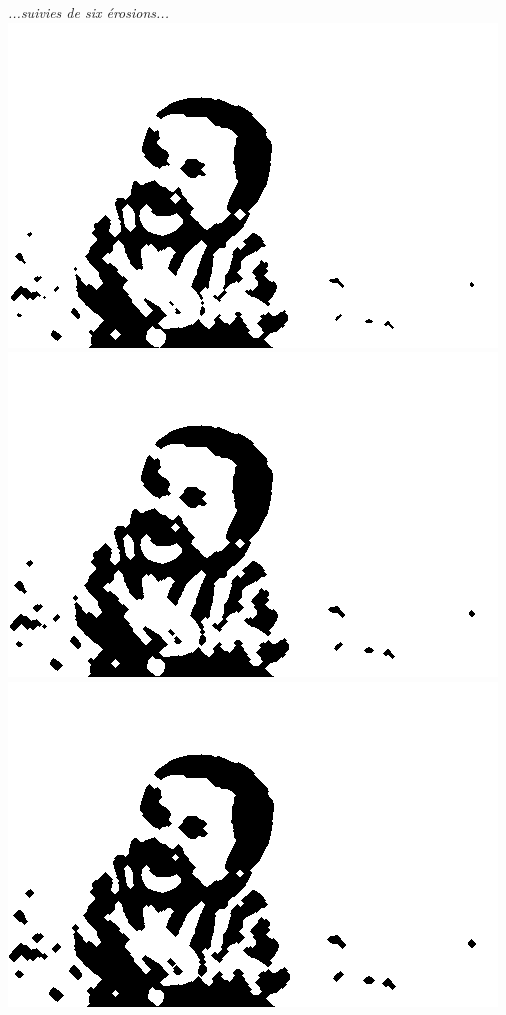 \documentclass[a4paper,11pt]{article}
\begin{document}
\begin{center}
\textit{...suivies de six érosions...}
\\
\includegraphics[scale=0.22]{babyd3e6d1.png}
\includegraphics[scale=0.22]{babyd3e6d2.png}
\includegraphics[scale=0.22]{babyd3e6d3.png}\\

\end{center}
\end{document}
